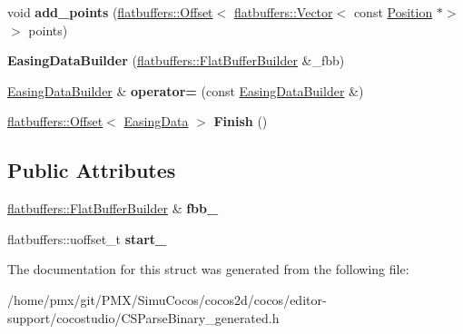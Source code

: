 \begin{DoxyCompactItemize}
void {\bfseries add\+\_\+points} (\hyperlink{structflatbuffers_1_1Offset}{flatbuffers\+::\+Offset}$<$ \hyperlink{classflatbuffers_1_1Vector}{flatbuffers\+::\+Vector}$<$ const \hyperlink{structPosition}{Position} $\ast$$>$$>$ points)
\item 
\mbox{\label{structflatbuffers_1_1EasingDataBuilder_a1f8180c013c4306ba9a1189f9f34c7f8}} 
{\bfseries Easing\+Data\+Builder} (\hyperlink{classflatbuffers_1_1FlatBufferBuilder}{flatbuffers\+::\+Flat\+Buffer\+Builder} \&\+\_\+fbb)
\item 
\mbox{\label{structflatbuffers_1_1EasingDataBuilder_a4eb83926fd87330e883a13b6b9fca8b2}} 
\hyperlink{structflatbuffers_1_1EasingDataBuilder}{Easing\+Data\+Builder} \& {\bfseries operator=} (const \hyperlink{structflatbuffers_1_1EasingDataBuilder}{Easing\+Data\+Builder} \&)
\item 
\mbox{\label{structflatbuffers_1_1EasingDataBuilder_a9e84d209acb627a9199e3b38e7e037c1}} 
\hyperlink{structflatbuffers_1_1Offset}{flatbuffers\+::\+Offset}$<$ \hyperlink{structflatbuffers_1_1EasingData}{Easing\+Data} $>$ {\bfseries Finish} ()
\end{DoxyCompactItemize}
\subsection*{Public Attributes}
\begin{DoxyCompactItemize}
\item 
\mbox{\label{structflatbuffers_1_1EasingDataBuilder_a9fa7b3c2ad7e124d9bd5af0b17b296b8}} 
\hyperlink{classflatbuffers_1_1FlatBufferBuilder}{flatbuffers\+::\+Flat\+Buffer\+Builder} \& {\bfseries fbb\+\_\+}
\item 
\mbox{\label{structflatbuffers_1_1EasingDataBuilder_aea8af24f83b50f6720fffab62ca57250}} 
flatbuffers\+::uoffset\+\_\+t {\bfseries start\+\_\+}
\end{DoxyCompactItemize}


The documentation for this struct was generated from the following file\+:\begin{DoxyCompactItemize}
\item 
/home/pmx/git/\+P\+M\+X/\+Simu\+Cocos/cocos2d/cocos/editor-\/support/cocostudio/C\+S\+Parse\+Binary\+\_\+generated.\+h\end{DoxyCompactItemize}
